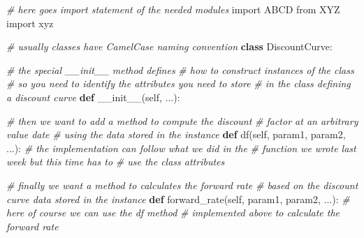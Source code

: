 \documentclass[11pt]{article}
\newenvironment{Shaded}{}{}
\newcommand{\KeywordTok}[1]{\textcolor[rgb]{0.00,0.44,0.13}{\textbf{{#1}}}}
\newcommand{\CommentTok}[1]{\textcolor[rgb]{0.38,0.63,0.69}{\textit{{#1}}}}
\newcommand{\FunctionTok}[1]{\textcolor[rgb]{0.02,0.16,0.49}{{#1}}}
\newcommand{\NormalTok}[1]{{#1}}
\newcommand{\ImportTok}[1]{{#1}}
\newcommand{\VariableTok}[1]{\textcolor[rgb]{0.10,0.09,0.49}{{#1}}}
\begin{document}
\begin{Shaded}
\begin{Highlighting}[]
\CommentTok{# here goes import statement of the needed modules}
\ImportTok{import}\NormalTok{ ABCD}
\ImportTok{from}\NormalTok{ XYZ }\ImportTok{import}\NormalTok{ xyz}

\CommentTok{# usually classes have CamelCase naming convention}
\KeywordTok{class}\NormalTok{ DiscountCurve:}

    \CommentTok{# the special __init__ method defines }
    \CommentTok{# how to construct instances of the class}
    \CommentTok{# so you need to identify the attributes you need to store }
    \CommentTok{# in the class defining a discount curve}
    \KeywordTok{def} \FunctionTok{__init__}\NormalTok{(}\VariableTok{self}\NormalTok{, ...):}

    \CommentTok{# then we want to add a method to compute the discount}
    \CommentTok{# factor at an arbitrary value date }
    \CommentTok{# using the data stored in the instance}
    \KeywordTok{def}\NormalTok{ df(}\VariableTok{self}\NormalTok{, param1, param2, ...):}
      \CommentTok{# the implementation can follow what we did in the }
      \CommentTok{# function we wrote last week but this time has to }
      \CommentTok{# use the class attributes}
      
    \CommentTok{# finally we want a method to calculates the forward rate }
    \CommentTok{# based on the discount curve data stored in the instance}
    \KeywordTok{def}\NormalTok{ forward_rate(}\VariableTok{self}\NormalTok{, param1, param2, ...):}
        \CommentTok{# here of course we can use the df method }
        \CommentTok{# implemented above to calculate the forward rate}
\end{Highlighting}
\end{Shaded}


    
    
    
    
\end{document}
